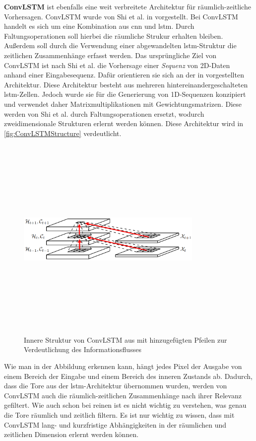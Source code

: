 \textbf{ConvLSTM} ist ebenfalls eine weit verbreitete Architektur für räumlich-zeitliche Vorhersagen.
Conv\-LSTM wurde von Shi et al. in \cite{ConvLSTM} vorgestellt.
Bei ConvLSTM handelt es sich um eine Kombination aus \acrshort{cnn} und \acrshort{lstm}.
Durch Faltungsoperationen soll hierbei die räumliche Strukur erhalten bleiben.
Außerdem soll durch die Verwendung einer abgewandelten \acrshort{lstm}-Struktur die zeitlichen Zusammenhänge erfasst werden.
Das ursprüngliche Ziel von ConvLSTM ist nach Shi et al. die Vorhersage einer \emph{Sequenz} von 2D-Daten anhand einer Eingabesequenz.
Dafür orientieren sie sich an der in \cite{SequenceGeneratingLSTM} vorgestellten Architektur.
Diese Architektur besteht aus mehreren hintereinandergeschalteten \acrshort{lstm}-Zellen.
Jedoch wurde sie für die Generierung von 1D-Sequenzen konzipiert und verwendet daher Matrixmultiplikationen mit Gewichtungsmatrizen.
Diese werden von Shi et al. durch Faltungsoperationen ersetzt, wodurch zweidimensionale Strukturen erlernt werden können.
Diese Architektur wird in \autoref{fig:ConvLSTMStructure} verdeutlicht.

\begin{figure}[h]
    \centering
    \includegraphics[width=0.8\textwidth,height=10cm,keepaspectratio=true]{content/images/ConvLSTMStructure.png}
    \caption{Innere Struktur von ConvLSTM aus \cite{ConvLSTM} mit hinzugefügten Pfeilen zur Verdeutlichung des Informationsflusses}
    \label{fig:ConvLSTMStructure}
\end{figure}

Wie man in der Abbildung erkennen kann, hängt jedes Pixel der Ausgabe von einem Bereich der Eingabe und einem Bereich des inneren Zustands ab.
Dadurch, dass die Tore aus der \acrshort{lstm}-Architektur übernommen wurden, werden von ConvLSTM auch die räumlich-zeitlichen Zusammenhänge nach ihrer Relevanz gefiltert.
Wie auch schon bei reinen  ist es nicht wichtig zu verstehen, was genau die Tore räumlich und zeitlich filtern.
Es ist nur wichtig zu wissen, dass mit ConvLSTM lang- und kurzfristige Abhängigkeiten in der räumlichen und zeitlichen Dimension erlernt werden können.

